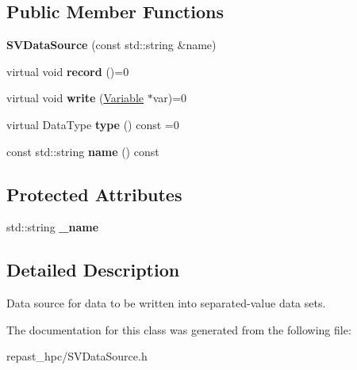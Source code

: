 \subsection*{Public Member Functions}
\begin{DoxyCompactItemize}
\item 
\hypertarget{classrepast_1_1_s_v_data_source_a5a49ad1041252dab39f3060ae87ce58e}{{\bfseries S\-V\-Data\-Source} (const std\-::string \&name)}\label{classrepast_1_1_s_v_data_source_a5a49ad1041252dab39f3060ae87ce58e}

\item 
\hypertarget{classrepast_1_1_s_v_data_source_a2248758957add75f32afae0b2b4f0a38}{virtual void {\bfseries record} ()=0}\label{classrepast_1_1_s_v_data_source_a2248758957add75f32afae0b2b4f0a38}

\item 
\hypertarget{classrepast_1_1_s_v_data_source_aef81c7038475612e7269c7c0c915f5f2}{virtual void {\bfseries write} (\hyperlink{classrepast_1_1_variable}{Variable} $\ast$var)=0}\label{classrepast_1_1_s_v_data_source_aef81c7038475612e7269c7c0c915f5f2}

\item 
\hypertarget{classrepast_1_1_s_v_data_source_a76ecff693c73b2468f7bc2513265d3ed}{virtual Data\-Type {\bfseries type} () const =0}\label{classrepast_1_1_s_v_data_source_a76ecff693c73b2468f7bc2513265d3ed}

\item 
\hypertarget{classrepast_1_1_s_v_data_source_af187b215688f83eba4feb8dbd1c96132}{const std\-::string {\bfseries name} () const }\label{classrepast_1_1_s_v_data_source_af187b215688f83eba4feb8dbd1c96132}

\end{DoxyCompactItemize}
\subsection*{Protected Attributes}
\begin{DoxyCompactItemize}
\item 
\hypertarget{classrepast_1_1_s_v_data_source_acd400ad4c434f837dc41f4aecb5499f2}{std\-::string {\bfseries \-\_\-name}}\label{classrepast_1_1_s_v_data_source_acd400ad4c434f837dc41f4aecb5499f2}

\end{DoxyCompactItemize}


\subsection{Detailed Description}
Data source for data to be written into separated-\/value data sets. 

The documentation for this class was generated from the following file\-:\begin{DoxyCompactItemize}
\item 
repast\-\_\-hpc/S\-V\-Data\-Source.\-h\end{DoxyCompactItemize}
